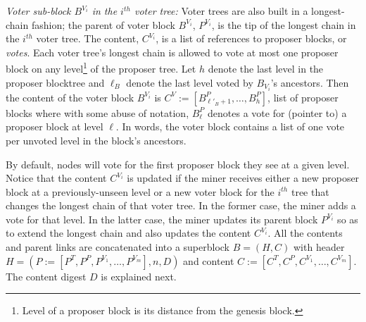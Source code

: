 \emph{Voter sub-block $B^{V_i}$ in the $i^{th}$ voter tree:} 
Voter trees are also  built in a longest-chain fashion; the  parent of voter block  $B^{V_i}$, $P^{V_i}$, is the tip of the longest chain in the $i^{th}$ voter tree.
The content, $C^{V_i}$, is a list of references to proposer blocks, or \emph{votes}.
Each voter tree's longest chain is allowed to vote at most one proposer block on any level\footnote{
Level of a proposer block is its distance from the genesis block.} of the proposer tree.
Let $h$ denote the last level in the proposer blocktree and $\ell_B$ denote the last level voted by $B_{V_i}$'s ancestors.
Then the content of the voter block $B^{V_i}$ is $C^V := [B^P_{\ell'_{B}+1},\ldots,B^P_{h}]$, list of proposer blocks where with some abuse of notation, $B^P_{\ell}$ denotes a vote for  (pointer to) a proposer block at level $\ell$. 
In words,  the voter block contains a list of one vote per unvoted level in the block's ancestors. 

By default, nodes will vote for the first proposer block they see at a given level.
Notice that the content $C^{V_i}$ is updated if the miner receives either a new proposer block at a previously-unseen level or a new voter block for the $i^{th}$ tree that changes the longest chain of that voter tree. 
In  the former case, the miner adds a vote for that level. 
In the latter case, the miner updates its parent block $P^{V_i}$ so as to extend the longest chain and also updates the content $C^{V_i}$.
All the contents and parent links are concatenated into a superblock $B=(H,C)$ with header 
$H=(P:=[P^T,  P^P, P^{V_1}, \ldots, P^{V_m}], n, D)$ 
and content 
$ C := [ C^T, C^P, C^{V_1}, \ldots, C^{V_m}]$.
The content digest $D$ is explained next.


